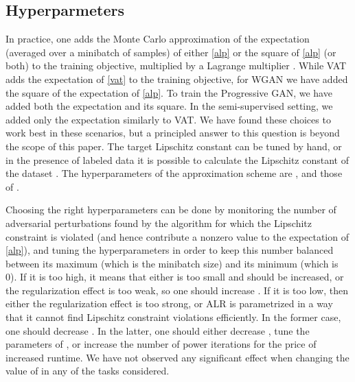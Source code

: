 \documentclass{article}
\begin{document}
\subsection{Hyperparmeters}
In practice, one adds the Monte Carlo approximation of the expectation (averaged over a minibatch of samples) of either \eqref{alp} or the square of \eqref{alp} (or both) to the training objective, multiplied by a Lagrange multiplier . While VAT adds the expectation of \eqref{vat} to the training objective, for WGAN we have added the square of the expectation of \eqref{alp}. To train the Progressive GAN, we have added both the expectation and its square. In the semi-supervised setting, we added only the expectation similarly to VAT. We have found these choices to work best in these scenarios, but a principled answer to this question is beyond the scope of this paper. The target Lipschitz constant  can be tuned by hand, or in the presence of labeled data it is possible to calculate the Lipschitz constant of the dataset \citep{Obermanetal2018}. The hyperparameters of the approximation scheme are ,  and those of .

Choosing the right hyperparameters can be done by monitoring the number of adversarial perturbations found by the algorithm for which the Lipschitz constraint is violated (and hence contribute a nonzero value to the expectation of \eqref{alp}), and tuning the hyperparameters in order to keep this number balanced between its maximum (which is the minibatch size) and its minimum (which is 0). If it is too high, it means that either  is too small and should be increased, or the regularization effect is too weak, so one should increase . If it is too low, then either the regularization effect is too strong, or ALR is parametrized in a way that it cannot find Lipschitz constraint violations efficiently. In the former case, one should decrease . In the latter, one should either decrease , tune the parameters of , or increase the number of power iterations  for the price of increased runtime. We have not observed any significant effect when changing the value of  in any of the tasks considered.
\end{document}
